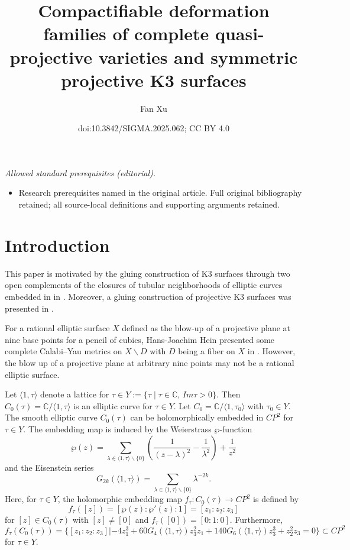 \documentclass[10pt,a4paper]{amsart}
\title{Compactifiable deformation families of complete quasi-projective varieties and symmetric projective K3 surfaces}
\author{Fan Xu}
\date{doi:10.3842/SIGMA.2025.062; CC BY 4.0}
\numberwithin{equation}{section}
\def\operatorname#1{#1}
\def\overline#1{#1}
\begin{document}
\maketitle
\noindent\textit{Allowed standard prerequisites (editorial).}\begin{itemize}
\item Research prerequisites named in the original article. Full original bibliography retained; all source-local definitions and supporting arguments retained.
\end{itemize}\medskip
\section{Introduction}

This paper is motivated by the gluing construction of K3 surfaces through two open complements of the closures of tubular neighborhoods of elliptic curves embedded in \smash{$\operatorname{CP}^2 \#9\overline{\operatorname{CP}}^2$} in \cite{Takayuki-Takato1}. Moreover, a gluing construction of projective K3 surfaces was presented in \cite{Takayuki-Takato2}.

For a rational elliptic surface $ X $ defined as the blow-up of a projective plane at nine base points for a pencil of cubics, Hans-Joachim Hein presented some complete Calabi--Yau metrics on $ X \backslash D $ with $D$ being a fiber on $X$ in \cite{Hans}. However, the blow up of a projective plane at arbitrary nine points may not be a rational elliptic surface.

Let $ \langle 1,\tau \rangle$ denote a lattice for $\tau\in Y:=\{\tau \mid \tau\in \mathbb{C},\, \operatorname{\operatorname{Im}}\tau>0 \}$. Then $C_0(\tau)=\mathbb{C}/ \langle 1,\tau \rangle$ is an elliptic curve for $\tau\in Y$. Let $C_0=\mathbb{C}/ \langle 1,\tau_0 \rangle$ with $\tau_0 \in Y$. The smooth elliptic curve $C_0 (\tau)$ can be holomorphically embedded in $\operatorname{CP}^2$ for $\tau \in Y$. The embedding map is induced by the Weierstrass $\wp$-function
\[\wp(z) =\sum _{\lambda \in \langle 1,\tau \rangle \backslash \{0\}} \left(\frac{1}{(z-\lambda )^2}-\frac{1}{\lambda ^2}\right)+\frac{1}{z^2}\]
and the Eisenstein series
\[G_{2k} ( \langle 1,\tau \rangle)=\sum _{\lambda \in \langle 1,\tau \rangle \backslash \{0\}} \lambda ^{-2k}.\]
Here, for $\tau\in Y$, the holomorphic embedding map $f_\tau\colon C_0 (\tau) \rightarrow\operatorname{CP}^2$ is defined by
\[f_\tau([z])=[\wp(z):\wp'(z):1]=[z_1:z_2:z_3]\]
for $[z]\in C_0 (\tau)$ with $[z]\neq[0]$ and $f_\tau([0])=[0:1:0]$. Furthermore,
\[f_\tau(C_0(\tau))=\bigl\{ [z_1:z_2:z_3]|-4 z_1^3+60 G_4 ( \langle 1,\tau \rangle)z_3^2 z_1+140 G_6 ( \langle 1,\tau \rangle)z_3^3+z_2^2 z_3=0\bigr\}\subset\operatorname{CP}^2\]
for $\tau \in Y$.
\end{document}

